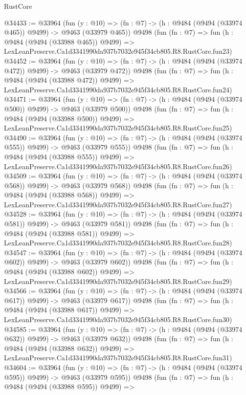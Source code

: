 \begin{lexlean}{RustCore}
\begin{coremodule}
@34433 := @33964
    (fun (y : @10) => (fn : @7) -> (h : @9484 (@9494 (@33974 @465)) @9499) -> @9463 (@33979 @465))
    @9498
    (fun (fn : @7) =>
    fun (h : @9484 (@9494 (@33988 @465)) @9499) =>
    LexLeanPreserve.Ca1d3341990da937b7032e945f34cb805.R8.RustCore.fun23)
@34452 := @33964
    (fun (y : @10) => (fn : @7) -> (h : @9484 (@9494 (@33974 @472)) @9499) -> @9463 (@33979 @472))
    @9498
    (fun (fn : @7) =>
    fun (h : @9484 (@9494 (@33988 @472)) @9499) =>
    LexLeanPreserve.Ca1d3341990da937b7032e945f34cb805.R8.RustCore.fun24)
@34471 := @33964
    (fun (y : @10) => (fn : @7) -> (h : @9484 (@9494 (@33974 @500)) @9499) -> @9463 (@33979 @500))
    @9498
    (fun (fn : @7) =>
    fun (h : @9484 (@9494 (@33988 @500)) @9499) =>
    LexLeanPreserve.Ca1d3341990da937b7032e945f34cb805.R8.RustCore.fun25)
@34490 := @33964
    (fun (y : @10) => (fn : @7) -> (h : @9484 (@9494 (@33974 @555)) @9499) -> @9463 (@33979 @555))
    @9498
    (fun (fn : @7) =>
    fun (h : @9484 (@9494 (@33988 @555)) @9499) =>
    LexLeanPreserve.Ca1d3341990da937b7032e945f34cb805.R8.RustCore.fun26)
@34509 := @33964
    (fun (y : @10) => (fn : @7) -> (h : @9484 (@9494 (@33974 @568)) @9499) -> @9463 (@33979 @568))
    @9498
    (fun (fn : @7) =>
    fun (h : @9484 (@9494 (@33988 @568)) @9499) =>
    LexLeanPreserve.Ca1d3341990da937b7032e945f34cb805.R8.RustCore.fun27)
@34528 := @33964
    (fun (y : @10) => (fn : @7) -> (h : @9484 (@9494 (@33974 @581)) @9499) -> @9463 (@33979 @581))
    @9498
    (fun (fn : @7) =>
    fun (h : @9484 (@9494 (@33988 @581)) @9499) =>
    LexLeanPreserve.Ca1d3341990da937b7032e945f34cb805.R8.RustCore.fun28)
@34547 := @33964
    (fun (y : @10) => (fn : @7) -> (h : @9484 (@9494 (@33974 @602)) @9499) -> @9463 (@33979 @602))
    @9498
    (fun (fn : @7) =>
    fun (h : @9484 (@9494 (@33988 @602)) @9499) =>
    LexLeanPreserve.Ca1d3341990da937b7032e945f34cb805.R8.RustCore.fun29)
@34566 := @33964
    (fun (y : @10) => (fn : @7) -> (h : @9484 (@9494 (@33974 @617)) @9499) -> @9463 (@33979 @617))
    @9498
    (fun (fn : @7) =>
    fun (h : @9484 (@9494 (@33988 @617)) @9499) =>
    LexLeanPreserve.Ca1d3341990da937b7032e945f34cb805.R8.RustCore.fun30)
@34585 := @33964
    (fun (y : @10) => (fn : @7) -> (h : @9484 (@9494 (@33974 @632)) @9499) -> @9463 (@33979 @632))
    @9498
    (fun (fn : @7) =>
    fun (h : @9484 (@9494 (@33988 @632)) @9499) =>
    LexLeanPreserve.Ca1d3341990da937b7032e945f34cb805.R8.RustCore.fun31)
@34604 := @33964
    (fun (y : @10) => (fn : @7) -> (h : @9484 (@9494 (@33974 @595)) @9499) -> @9463 (@33979 @595))
    @9498
    (fun (fn : @7) =>
    fun (h : @9484 (@9494 (@33988 @595)) @9499) =>

\end{coremodule}
\end{lexlean}
